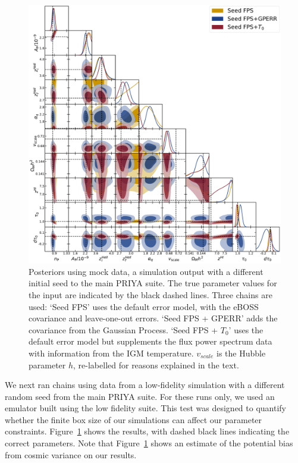 \begin{figure}
    \centering
    \includegraphics[width=\textwidth]{figures/simdat-seed.pdf}
    \caption{\label{fig:simdat_posteriors}
    Posteriors using mock data, a simulation output with a different initial seed to the main PRIYA suite.
    The true parameter values for the input are indicated by the black dashed lines.
    Three chains are used: `Seed FPS' uses the default error model, with the eBOSS covariance and leave-one-out errors.
    `Seed FPS + GPERR' adds the covariance from the Gaussian Process.
    `Seed FPS + $T_0$' uses the default error model but supplements the flux power spectrum data with information from the IGM temperature.
    $v_{scale}$ is the Hubble parameter $h$, re-labelled for reasons explained in the text.}
\end{figure}

We next ran chains using data from a low-fidelity simulation with a different random seed from the main PRIYA suite.
For these runs only, we used an emulator built using the low fidelity suite.
This test was designed to quantify whether the finite box size of our simulations can affect our parameter constraints.
Figure~\ref{fig:simdat_posteriors} shows the results, with dashed black lines indicating the correct parameters. Note that Figure~\ref{fig:simdat_posteriors} shows an estimate of the potential bias from cosmic variance on our results.

